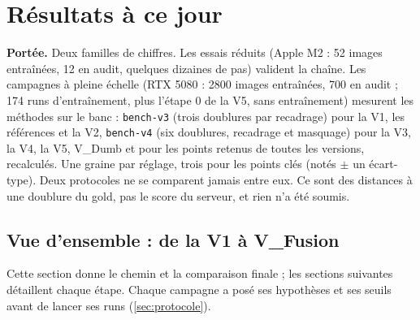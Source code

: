 \documentclass[11pt,a4paper]{article}
\newcommand{\code}[1]{\texttt{#1}}
\begin{document}
\section{Résultats à ce jour}\label{sec:resultats}

\begin{avertissement}
\textbf{Portée.} Deux familles de chiffres. Les essais réduits (Apple M2 : 52 images entraînées,
12 en audit, quelques dizaines de pas) valident la chaîne. Les campagnes à pleine échelle
(RTX 5080 : 2800 images entraînées, 700 en audit ; 174 runs d'entraînement, plus l'étape 0 de la V5,
sans entraînement) mesurent les méthodes sur le banc :
\code{bench-v3} (trois doublures par recadrage) pour la V1, les références et la V2,
\code{bench-v4} (six doublures, recadrage et masquage) pour la V3, la V4, la V5, V\_Dumb et pour
les points retenus de toutes les versions, recalculés. Une graine par réglage, trois pour les points clés (notés $\pm$
un écart-type). Deux protocoles ne se comparent jamais entre eux. Ce sont des distances à une
doublure du gold, pas le score du serveur, et rien n'a été soumis.
\end{avertissement}

\subsection{Vue d'ensemble : de la V1 à V\_Fusion}\label{sec:vue}
Cette section donne le chemin et la comparaison finale ; les sections suivantes détaillent chaque
étape. Chaque campagne a posé ses hypothèses et ses seuils avant de lancer ses runs
(\cref{sec:protocole}).
\end{document}
